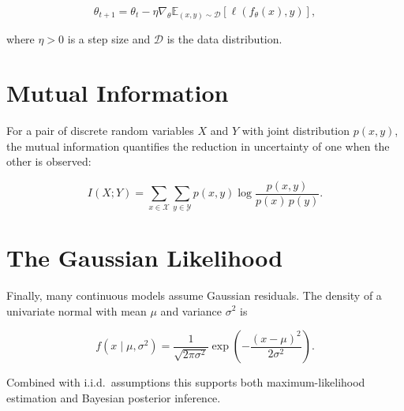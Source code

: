 \documentclass[11pt]{article}
\begin{document}
\begin{equation}
\theta_{t+1} = \theta_t - \eta \nabla_\theta \mathbb{E}_{(x,y) \sim \mathcal{D}} \left[ \ell(f_\theta(x), y) \right],
\end{equation}

where $\eta > 0$ is a step size and $\mathcal{D}$ is the data distribution.

\section{Mutual Information}

For a pair of discrete random variables $X$ and $Y$ with joint distribution
$p(x,y)$, the mutual information quantifies the reduction in uncertainty of
one when the other is observed:

\begin{equation}
I(X; Y) = \sum_{x \in \mathcal{X}} \sum_{y \in \mathcal{Y}} p(x, y) \log \frac{p(x, y)}{p(x)\, p(y)}.
\end{equation}

\section{The Gaussian Likelihood}

Finally, many continuous models assume Gaussian residuals. The density of a
univariate normal with mean $\mu$ and variance $\sigma^2$ is

\begin{equation}
f(x \mid \mu, \sigma^2) = \frac{1}{\sqrt{2\pi\sigma^2}} \exp\!\left( -\frac{(x - \mu)^2}{2\sigma^2} \right).
\end{equation}

Combined with i.i.d.\ assumptions this supports both maximum-likelihood
estimation and Bayesian posterior inference.
\end{document}
